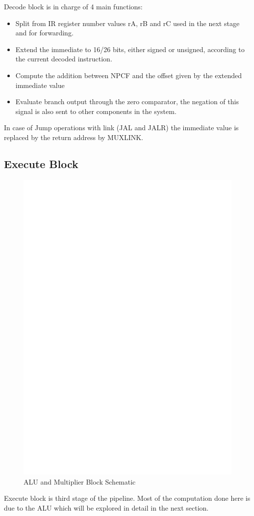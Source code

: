 \documentclass[12pt]{article}
\begin{document}
Decode block is in charge of 4 main functions:
\begin{itemize}
	\item Split from IR register number values rA, rB and rC used in the next stage and for forwarding.
	\item Extend the immediate to 16/26 bits, either signed or unsigned, according to the current decoded instruction.
	\item Compute the addition between NPCF and the offset given by the extended immediate value
	\item Evaluate branch output through the zero comparator, the negation of this signal is also sent to other components in the system.
\end{itemize}
In case of Jump operations with link (JAL and JALR) the immediate value is replaced by the return address by MUXLINK.

\subsection{Execute Block}
\begin{figure}[ht!]
	\includegraphics[width=\textwidth, center]{images/DLX_ALU.eps}
	\caption{ALU and Multiplier Block Schematic}
	\label{ALU}
\end{figure}
Execute block is third stage of the pipeline. Most of the computation done here is due to the ALU which will be explored in detail in the next section.
\end{document}
